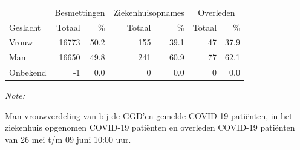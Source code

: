 \documentclass[
  english,
  man,floatsintext]{apa6}
\begin{document}
\begin{table}
\centering\begingroup\fontsize{11}{13}\selectfont

\begin{threeparttable}
\begin{tabular}{lrrrrrr}
\toprule
\multicolumn{1}{c}{ } & \multicolumn{2}{c}{Besmettingen} & \multicolumn{2}{c}{Ziekenhuisopnames} & \multicolumn{2}{c}{Overleden} \\
\cmidrule(l{3pt}r{3pt}){2-3} \cmidrule(l{3pt}r{3pt}){4-5} \cmidrule(l{3pt}r{3pt}){6-7}
Geslacht & Totaal & \% & Totaal & \% & Totaal & \%\\
\midrule
Vrouw & 16773 & 50.2 & 155 & 39.1 & 47 & 37.9\\
Man & 16650 & 49.8 & 241 & 60.9 & 77 & 62.1\\
Onbekend & -1 & 0.0 & 0 & 0.0 & 0 & 0.0\\
\bottomrule
\end{tabular}
\begin{tablenotes}
\item \textit{Note: } 
\item Man-vrouwverdeling van bij de GGD’en gemelde COVID-19 patiënten, in het ziekenhuis opgenomen COVID-19 patiënten en overleden COVID-19 patiënten van 26 mei t/m 09 juni 10:00 uur.
\end{tablenotes}
\end{threeparttable}
\endgroup{}
\end{table}
\newpage
\end{document}

